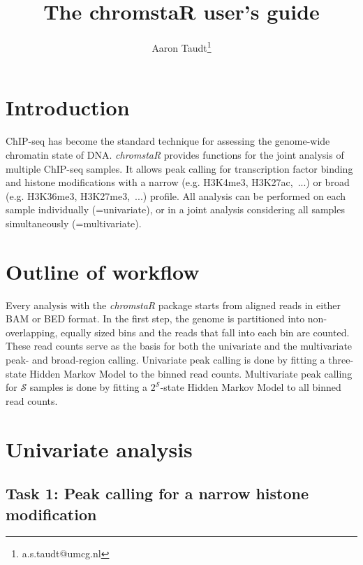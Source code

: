 \documentclass[11pt]{article}\usepackage[]{graphicx}\usepackage[]{color}
\author{Aaron Taudt\footnote{a.s.taudt@umcg.nl}}
\newcommand{\Rpackage}[1]{{\textit{#1}}}
\begin{document}
\title{The chromstaR user's guide}

\maketitle

\tableofcontents
\section{Introduction}

ChIP-seq has become the standard technique for assessing the genome-wide chromatin state of DNA. \Rpackage{chromstaR} provides functions for the joint analysis of multiple ChIP-seq samples. It allows peak calling for transcription factor binding and histone modifications with a narrow (e.g. H3K4me3, H3K27ac,~...) or broad (e.g. H3K36me3, H3K27me3,~...) profile. All analysis can be performed on each sample individually (=univariate), or in a joint analysis considering all samples simultaneously (=multivariate).



\section{Outline of workflow}

Every analysis with the \Rpackage{chromstaR} package starts from aligned reads in either BAM or BED format. In the first step, the genome is partitioned into non-overlapping, equally sized bins and the reads that fall into each bin are counted. These read counts serve as the basis for both the univariate and the multivariate peak- and broad-region calling. Univariate peak calling is done by fitting a three-state Hidden Markov Model to the binned read counts. Multivariate peak calling for $\mathcal{S}$ samples is done by fitting a $2^\mathcal{S}$-state Hidden Markov Model to all binned read counts.

\section{Univariate analysis}

\subsection{\label{sec:narrow}Task 1: Peak calling for a narrow histone modification}
\end{document}
